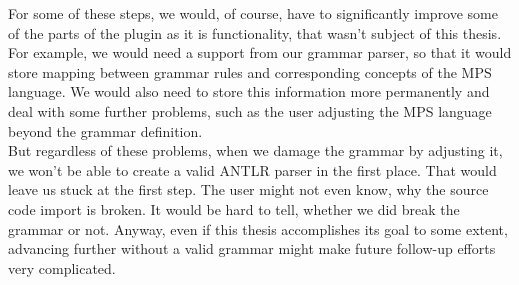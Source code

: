 For some of these steps, we would, of course, have to significantly improve some of the parts of the plugin as it is functionality, that wasn't subject of this thesis.
For example, we would need a support from our grammar parser, so that it would store mapping between grammar rules and corresponding concepts of the MPS language.
We would also need to store this information more permanently and deal with some further problems, such as the user adjusting the MPS language beyond the grammar definition.
\\

But regardless of these problems, when we damage the grammar by adjusting it, we won't be able to create a valid ANTLR parser in the first place.
That would leave us stuck at the first step.
The user might not even know, why the source code import is broken.
It would be hard to tell, whether we did break the grammar or not.
Anyway, even if this thesis accomplishes its goal to some extent, advancing further without a valid grammar might make future follow-up efforts very complicated.
